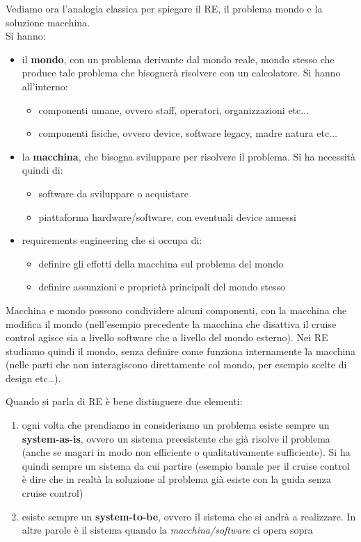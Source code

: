 \documentclass[a4paper,12pt, oneside]{book}
\begin{document}
\begin{esempio}
  Vediamo ora l'analogia classica per spiegare il RE, il \textup{problema mondo}
  e la \textup{soluzione macchina}.\\
  Si hanno:
  \begin{itemize}
    \item il \textbf{mondo}, con un problema derivante dal mondo reale, mondo
    stesso che produce tale problema che bisognerà risolvere con un
    calcolatore. Si hanno all'interno:
    \begin{itemize}
      \item \textup{componenti umane}, ovvero staff, operatori, organizzazioni
      etc$\ldots$
      \item \textup{componenti fisiche}, ovvero device, software legacy, madre
      natura etc$\ldots$
    \end{itemize}
    \item la \textbf{macchina}, che bisogna sviluppare per risolvere il
    problema. Si ha necessità quindi di:
    \begin{itemize}
      \item \textup{software} da sviluppare o acquistare
      \item \textup{piattaforma hardware/software}, con eventuali device annessi
    \end{itemize}
    
    \item \textup{requirements engineering} che si occupa di:
    \begin{itemize}
      \item definire gli effetti della \textup{macchina} sul problema del
      \textup{mondo} 
      \item definire assunzioni e proprietà principali del \textup{mondo} stesso
    \end{itemize}
  \end{itemize}
  Macchina e mondo possono condividere alcuni componenti, con la macchina che
  modifica il mondo (nell'esempio precedente la macchina che disattiva il cruise
  control agisce sia a livello software che a livello del mondo esterno). Nei RE
  studiamo quindi il \textup{mondo}, senza definire come funziona internamente
  la macchina (nelle parti che non interagiscono direttamente col mondo, per
  esempio scelte di design etc\ldots).
\end{esempio}
Quando si parla di RE è bene distinguere due elementi:
\begin{enumerate}
  \item ogni volta che prendiamo in consideriamo un problema esiste sempre un
  \textbf{system-as-is}, ovvero un sistema preesistente che già risolve il
  problema (anche se magari in modo non efficiente o qualitativamente
  sufficiente). Si ha quindi sempre un sistema da cui partire (esempio banale
  per il cruise control è dire che in realtà la soluzione al problema già esiste
  con la guida senza cruise control)
  \item esiste sempre un \textbf{system-to-be}, ovvero il sistema che si andrà a
  realizzare. In altre parole è il sistema quando la \textit{macchina/software}
  ci opera sopra
\end{enumerate}
\end{document}
